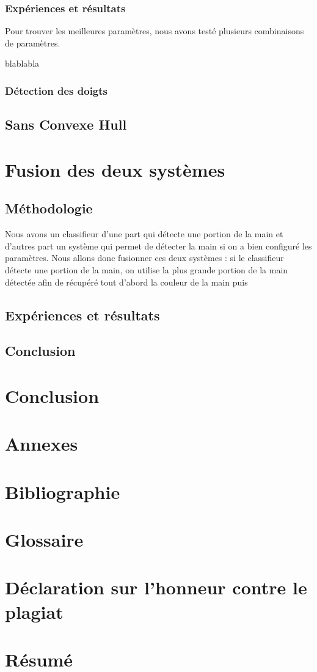 \documentclass[11pt]{article}
\begin{document}
\subsubsection{Expériences et résultats}
Pour trouver les meilleures paramètres, nous avons testé plusieurs combinaisons de paramètres.

blablabla

\subsubsection{Détection des doigts}

\subsection{Sans Convexe Hull}

\newpage

\section{Fusion des deux systèmes}
\subsection{Méthodologie}
Nous avons un classifieur d'une part qui détecte une portion de la main et d'autres part un système qui permet de détecter la main si on a bien configuré les paramètres. Nous allons donc fusionner ces deux systèmes : si le classifieur détecte une portion de la main, on utilise la plus grande portion de la main détectée afin de récupéré tout d'abord la couleur de la main puis
\subsection{Expériences et résultats}
\subsection{Conclusion}
\newpage

\section*{Conclusion}
\newpage

\section*{Annexes}

\section*{Bibliographie}
\newpage

\section*{Glossaire}

\section*{Déclaration sur l'honneur contre le plagiat}

\newpage

\newpage
\section*{Résumé}
\end{document}

